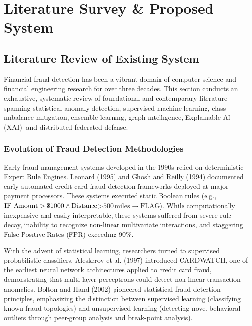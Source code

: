 \documentclass[12pt,a4paper,oneside]{report}
\begin{document}
\newpage


\chapter{Literature Survey \& Proposed System}

\section{Literature Review of Existing System}

Financial fraud detection has been a vibrant domain of computer science and financial engineering research for over three decades. This section conducts an exhaustive, systematic review of foundational and contemporary literature spanning statistical anomaly detection, supervised machine learning, class imbalance mitigation, ensemble learning, graph intelligence, Explainable AI (XAI), and distributed federated defense.


\subsection{Evolution of Fraud Detection Methodologies}

Early fraud management systems developed in the 1990s relied on deterministic Expert Rule Engines. Leonard (1995) and Ghosh and Reilly (1994) documented early automated credit card fraud detection frameworks deployed at major payment processors. These systems executed static Boolean rules (e.g., $\text{IF Amount} > \\\$1000 \land \text{Distance} $>$ 500\,\text{miles} \rightarrow \text{FLAG}$). While computationally inexpensive and easily interpretable, these systems suffered from severe rule decay, inability to recognize non-linear multivariate interactions, and staggering False Positive Rates (FPR) exceeding 90\%.


With the advent of statistical learning, researchers turned to supervised probabilistic classifiers. Aleskerov et al. (1997) introduced CARDWATCH, one of the earliest neural network architectures applied to credit card fraud, demonstrating that multi-layer perceptrons could detect non-linear transaction anomalies. Bolton and Hand (2002) pioneered statistical fraud detection principles, emphasizing the distinction between supervised learning (classifying known fraud topologies) and unsupervised learning (detecting novel behavioral outliers through peer-group analysis and break-point analysis).
\end{document}
